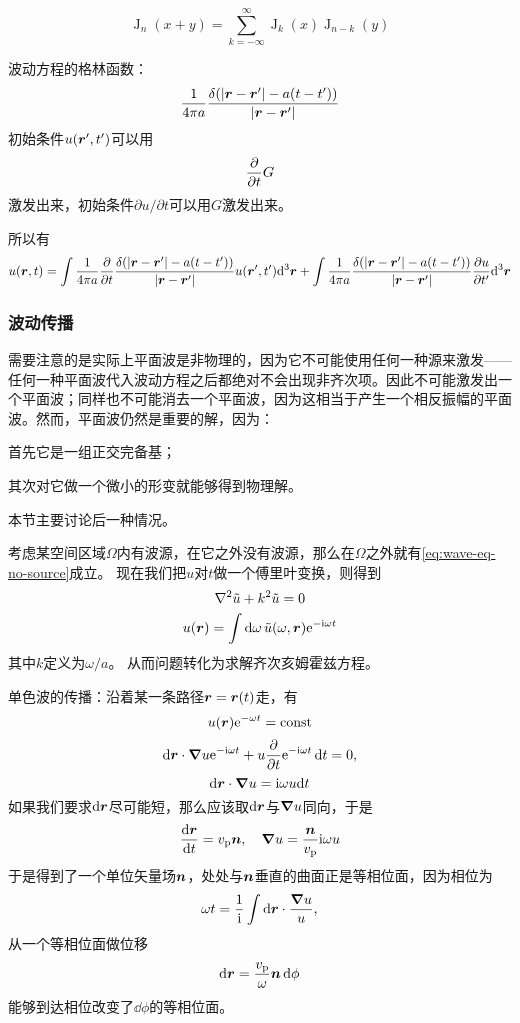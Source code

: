 \documentclass[UTF8]{ctexart}
\newcommand*{\ii}{\mathrm{i}}
\newcommand*{\ee}{\mathrm{e}}
\newcommand*{\const}{\mathrm{const}}
\DeclareMathOperator{\besselj}{J}
\renewenvironment{enumerate}{\begin{compactenum}}{\end{compactenum}}
\begin{document}
\begin{equation}
    \besselj_n(x+y) = \sum_{k=-\infty}^\infty \besselj_k(x) \besselj_{n-k}(y)
\end{equation}

波动方程的格林函数：
\begin{equation}
    \frac{1}{4\pi a} \frac{\delta(\abs{\vb*{r} - \vb*{r}'} - a(t - t'))}{\abs{\vb*{r} - \vb*{r}'}}
\end{equation}
初始条件$u(\vb*{r}', t')$可以用
\[
    \pdv{t} G
\]
激发出来，初始条件$\partial u / \partial t$可以用$G$激发出来。

所以有
\begin{equation}
    u(\vb*{r}, t) = \int \frac{1}{4\pi a} \pdv{t} \frac{\delta(\abs{\vb*{r} - \vb*{r}'} - a(t - t'))}{\abs{\vb*{r} - \vb*{r}'}} u(\vb*{r}', t') \dd^3 \vb*{r} 
    + \int \frac{1}{4\pi a} \frac{\delta(\abs{\vb*{r} - \vb*{r}'} - a(t - t'))}{\abs{\vb*{r} - \vb*{r}'}} \pdv{u}{t'} (\vb*{r}', t') \dd^3 \vb*{r}
\end{equation}

\subsubsection{波动传播}

需要注意的是实际上平面波是非物理的，因为它不可能使用任何一种源来激发——任何一种平面波代入波动方程之后都绝对不会出现非齐次项。因此不可能激发出一个平面波；同样也不可能消去一个平面波，因为这相当于产生一个相反振幅的平面波。然而，平面波仍然是重要的解，因为：
\begin{enumerate}
    \item 首先它是一组正交完备基；
    \item 其次对它做一个微小的形变就能够得到物理解。
\end{enumerate}
本节主要讨论后一种情况。

考虑某空间区域$\Omega$内有波源，在它之外没有波源，那么在$\Omega$之外就有\eqref{eq:wave-eq-no-source}成立。
现在我们把$u$对$t$做一个傅里叶变换，则得到
\begin{equation}
    \laplacian \tilde{u} + k^2 \tilde{u} = 0
    \label{eq:one-freq-wave}
\end{equation}
\[
    u(\vb*{r}) = \int \dd{\omega} \tilde{u}(\omega, \vb*{r}) \ee^{- \ii \omega t}
\]
其中$k$定义为$\omega / a$。
从而问题转化为求解齐次亥姆霍兹方程。

单色波的传播：沿着某一条路径$\vb*{r} = \vb*{r}(t)$走，有
\[
    u(\vb*{r}) \ee^{- \omega t} = \const
\]
\[
    \dd{\vb*{r}} \cdot \grad{u} \ee^{-\ii \omega t} + u \pdv{t} \ee^{-\ii \omega t} \dd{t} = 0,
\]
\[
    \dd{\vb*{r}} \cdot \grad{u} = \ii \omega u \dd t 
\]
如果我们要求$\dd{\vb*{r}}$尽可能短，那么应该取$\dd{\vb*{r}}$与$\grad{u}$同向，于是
\begin{equation}
    \dv{\vb*{r}}{t} = v_\text{p} \vb*{n}, \quad \grad{u} = \frac{\vb*{n}}{v_\text{p}} \ii \omega u
    \label{eq:phrase-surface}
\end{equation}
于是得到了一个单位矢量场$\vb*{n}$，处处与$\vb*{n}$垂直的曲面正是等相位面，因为相位为
\[
    \omega t = \frac{1}{\ii} \int \dd{\vb*{r}} \cdot \frac{\grad{u}}{u},
\]
从一个等相位面做位移
\[
    \dd{\vb*{r}} = \frac{v_\text{p}}{\omega} \vb*{n} \dd{\phi}
\]
能够到达相位改变了$\dd \phi$的等相位面。
\end{document}
